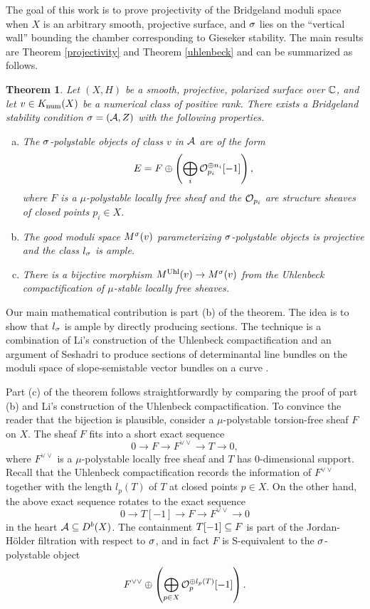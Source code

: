 \documentclass[letterpaper,11pt]{amsart}%
\newtheorem{thm}{Theorem}[section]
\theoremstyle{remark}
\begin{document}
The goal of this work is to prove projectivity of the Bridgeland moduli space when $X$ is an arbitrary smooth, projective surface, and $\sigma$ lies on the ``vertical wall'' bounding the chamber corresponding to Gieseker stability. The main results are Theorem \ref{projectivity} and Theorem \ref{uhlenbeck} and can be summarized as follows.
\begin{thm}
    Let $(X,H)$ be a smooth, projective, polarized surface over $\mathbb{C}$, and let $v \in K_{\mathrm{num}}(X)$ be a numerical class of positive rank. There exists a Bridgeland stability condition $\sigma = (\mathcal{A}, Z)$ with the following properties.
    \begin{enumerate}[(a)]
        \item The $\sigma$-polystable objects of class $v$ in $\mathcal{A}$ are of the form
        \[ E = F \oplus \left(\bigoplus_i \mathcal{O}_{p_i}^{\oplus n_i} [-1]\right), \]
        where $F$ is a $\mu$-polystable locally free sheaf and the $\mathcal{O}_{p_i}$ are structure sheaves of closed points $p_i \in X$.
        \item The good moduli space $M^\sigma(v)$ parameterizing $\sigma$-polystable objects is projective and the class $l_\sigma$ is ample.
        \item There is a bijective morphism $M^{\mathrm{Uhl}}(v) \to M^\sigma(v)$ from the Uhlenbeck compactification of $\mu$-stable locally free sheaves.
    \end{enumerate}
\end{thm}
Our main mathematical contribution is part (b) of the theorem. The idea is to show that $l_\sigma$ is ample by directly producing sections. The technique is a combination of Li's construction of the Uhlenbeck compactification and an argument of Seshadri to produce sections of determinantal line bundles on the moduli space of slope-semistable vector bundles on a curve \cite{seshadri}.

Part (c) of the theorem follows straightforwardly by comparing the proof of part (b) and Li's construction of the Uhlenbeck compactification. To convince the reader that the bijection is plausible, consider a $\mu$-polystable torsion-free sheaf $F$ on $X$. The sheaf $F$ fits into a short exact sequence
\[ 0 \to F \to F^{\vee\vee} \to T \to 0, \]
where $F^{\vee\vee}$ is a $\mu$-polystable locally free sheaf and $T$ has 0-dimensional support. Recall that the Uhlenbeck compactification records the information of $F^{\vee\vee}$ together with the length $l_p(T)$ of $T$ at closed points $p \in X$. On the other hand, the above exact sequence rotates to the exact sequence
\[ 0 \to T[-1] \to F \to F^{\vee\vee} \to 0 \]
in the heart $\mathcal{A} \subseteq D^b(X)$. The containment $T[-1] \subseteq F$ is part of the Jordan-H\"older filtration with respect to $\sigma$, and in fact $F$ is S-equivalent to the $\sigma$-polystable object
\[ F^{\vee\vee} \oplus \left(\bigoplus_{p \in X} \mathcal{O}_p^{\oplus l_p(T)}[-1]\right). \]
\end{document}
